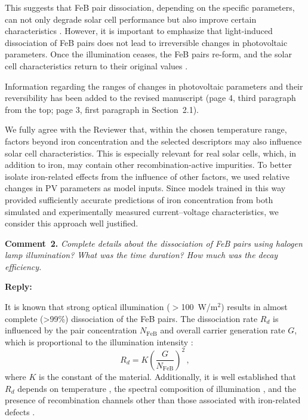 \documentclass[a4paper,fleqn]{cas-sc}
\begin{document}
This suggests that FeB pair dissociation, depending on the specific parameters,
can not only degrade solar cell performance but also improve certain characteristics \cite{Olikh2025MSEB,FeB:Schmidt}.
However, it is important to emphasize that light-induced dissociation of FeB pairs does not lead to irreversible changes in photovoltaic parameters.
Once the illumination ceases, the FeB pairs re-form, and the solar cell characteristics return to their original values \cite{FeBLight2,FeBAssJAP2014,FeBKin2019,FeMethod2012,FeBLight2,FeBAssJAP2014}.


Information regarding the ranges of changes in photovoltaic parameters and their reversibility has been added to the revised manuscript
(page 4, third paragraph from the top; page 3, first paragraph in Section~2.1).

We fully agree with the Reviewer that, within the chosen temperature range,
factors beyond iron concentration and the selected descriptors may also influence solar cell characteristics.
This is especially relevant for real solar cells, which, in addition to iron,
may contain other recombination-active impurities.
To better isolate iron-related effects from the influence of other factors,
we used relative changes in PV parameters as model inputs.
Since models trained in this way provided sufficiently accurate predictions of iron concentration from
both simulated and experimentally measured current–voltage characteristics, we consider this approach well justified.


\vspace{1cm}
\noindent
\textcolor[rgb]{0.00,0.50,1.00}{\textbf{Comment~2.}}
\emph{Complete details about the dissociation of FeB pairs using halogen lamp illumination? What was the time duration? How much was the decay efficiency.}

\noindent
\textcolor[rgb]{0.51,0.00,0.00}{\textbf{Reply:}}

It is known \cite{Macdonald2004} that strong optical illumination ($>$100~W/m$^{2}$)
results in almost complete (>99\%) dissociation of the FeB pairs.
The dissociation rate $R_d$ is influenced by the pair concentration $N_\mathrm{FeB}$ and overall carrier generation rate $G$, which is proportional to the illumination intensity
\cite{FeBLight2,FeBAssJAP2014,FeBKin2019,FeMethod2012}:
\begin{equation}
\label{eqRd}
R_d=K\left(\frac{G}{N_\mathrm{FeB}}\right)^2\,,
\end{equation}
where
$K$ is the constant of the material.
Additionally, it is well established that $R_d$ depends on temperature \cite{Lagowskii1993,lauer2016},
the spectral composition of illumination \cite{OlikhPSSA},
and the presence of recombination channels other than those associated with iron-related defects \cite{FeBLight2,FeBAssJAP2014}.
\end{document}
